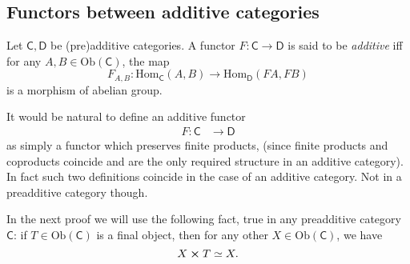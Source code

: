\documentclass[../Main]{subfiles}
\begin{document}
\subsection{Functors between additive categories}
\begin{defn}
	Let $\mathsf{C}, \mathsf{D}$ be (pre)additive categories.
	A functor $F\colon \mathsf{C} \to \mathsf{D}$ is said to be {\em additive} iff
	for any $A, B \in \mathrm{Ob} \left(\mathsf{C}\right)$, the map
	\begin{equation}
	F_{A,B}\colon \mathrm{Hom}_{\mathsf{C}} \left( A, B \right) \to \mathrm{Hom}_{\mathsf{D}} \left( FA, FB \right)
	\end{equation} 
	is a morphism of abelian group.
\end{defn}


\begin{rem}[]
	It would be natural to define an additive functor 
	\begin{align}
		F\colon \mathsf{C} &\longrightarrow \mathsf{D} 
	\end{align} 
	as simply a functor which preserves finite products, (since finite products and coproducts
	coincide and are the only required structure in an additive category).
	In fact such two definitions coincide in the case of an additive category.
	Not in a preadditive category though.
\end{rem}

\begin{rem}[]
	In the next proof we will use the following fact, true in any preadditive category $\mathsf{C}$:
	if $T \in \mathrm{Ob} \left(\mathsf{C}\right)$ is a final object, then for
	any other $X \in \mathrm{Ob} \left(\mathsf{C}\right)$, we have
	\begin{equation}
	X \cross T \simeq X
	.\end{equation} 
\end{rem}
\end{document}
